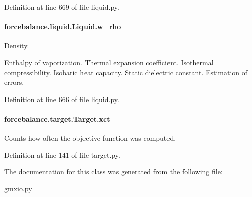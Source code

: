 Definition at line 669 of file liquid.\-py.

\hypertarget{classforcebalance_1_1liquid_1_1Liquid_aef8ad1dda086bde6f48130d273af9784}{
\paragraph[{w\-\_\-rho}]{\setlength{\rightskip}{0pt plus 5cm}forcebalance.\-liquid.\-Liquid.\-w\-\_\-rho\hspace{0.3cm}{\ttfamily [inherited]}}}\label{classforcebalance_1_1liquid_1_1Liquid_aef8ad1dda086bde6f48130d273af9784}


Density. 

Enthalpy of vaporization. Thermal expansion coefficient. Isothermal compressibility. Isobaric heat capacity. Static dielectric constant. Estimation of errors. 

Definition at line 666 of file liquid.\-py.

\hypertarget{classforcebalance_1_1target_1_1Target_aad2e385cfbf7b4a68f1c2cb41133fe82}{
\paragraph[{xct}]{\setlength{\rightskip}{0pt plus 5cm}forcebalance.\-target.\-Target.\-xct\hspace{0.3cm}{\ttfamily [inherited]}}}\label{classforcebalance_1_1target_1_1Target_aad2e385cfbf7b4a68f1c2cb41133fe82}


Counts how often the objective function was computed. 



Definition at line 141 of file target.\-py.



The documentation for this class was generated from the following file\-:\begin{DoxyCompactItemize}
\item 
\hyperlink{gmxio_8py}{gmxio.\-py}\end{DoxyCompactItemize}
